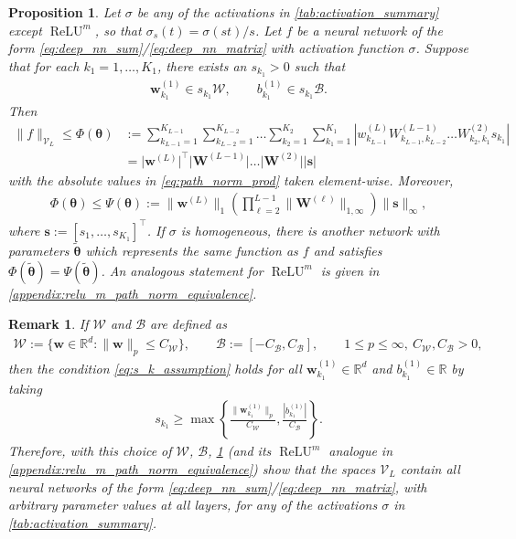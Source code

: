 \documentclass{article}
\DeclareMathOperator{\ReLU}{\mathrm{ReLU}}
\def\vtheta{{\bm{\theta}}}
\def\vs{{\bm{s}}}
\def\vw{{\bm{w}}}
\def\mW{{\bm{W}}}
\def\cB{{\mathcal{B}}}
\def\cV{{\mathcal{V}}}
\def\cW{{\mathcal{W}}}
\newcommand{\R}{\mathbb{R}}
\newtheorem{proposition}[theorem]{Proposition}
\newtheorem{remark}[theorem]{Remark}
\begin{document}
\begin{proposition} \label{prop:path_norm_equivalence}
      Let $\sigma$ be any of the activations in \cref{tab:activation_summary} except $\ReLU^m$, so that $\sigma_s(t) = \sigma(st)/s$. Let $f$ be a neural network of the form \eqref{eq:deep_nn_sum}/\eqref{eq:deep_nn_matrix} with activation function $\sigma$. Suppose that for each $k_1 = 1, \dots, K_1$, there exists an $s_{k_1} > 0$ such that 
    \begin{align} \label{eq:s_k_assumption}
         \vw_{k_1}^{(1)} \in s_{k_1} \cW, \qquad b_{k_1}^{(1)} \in s_{k_1} \cB.
    \end{align}
    Then
    \begin{align} 
        \| f \|_{\cV_L} \leq \Phi(\vtheta) &:= \sum_{k_{L-1}=1}^{K_{L-1}}     \sum_{k_{L-2}=1}^{K_{L-2}} \dots     \sum_{k_{2}=1}^{K_{2}}     \sum_{k_{1}=1}^{K_{1}}     \left| w_{k_{L-1}}^{(L)} W_{k_{L-1},k_{L-2}}^{(L-1)}  \dots  W_{k_2,k_1}^{(2)} s_{k_1} \right| \label{eq:path_norm_sum} \\
        &= \big| \vw^{(L)} \big|^\top \big| \mW^{(L-1)} \big| \dots \big| \mW^{(2)} \big| |\vs| \label{eq:path_norm_prod}
    \end{align}
    with the absolute values in \eqref{eq:path_norm_prod} taken element-wise. Moreover,
    \begin{align} \label{eq:path_norm_upper_bound_psi}
        \Phi(\vtheta) \leq \Psi(\vtheta) := \| \vw^{(L)} \|_1 \left( \prod_{\ell=2}^{L-1} \| \mW^{(\ell)} \|_{1,\infty} \right) \| \vs \|_\infty,
    \end{align}
    where $\vs := [s_1, \dots, s_{K_1}]^\top$. If $\sigma$ is homogeneous, there is another network with parameters $\widetilde{\vtheta}$ which represents the same function as $f$ and satisfies $\Phi(\widetilde{\vtheta}) = \Psi(\widetilde{\vtheta})$. An analogous statement for $\ReLU^m$ is given in \cref{appendix:relu_m_path_norm_equivalence}.
\end{proposition}
\begin{remark} \label{remark:admissible_weight_bias_sufficient_condition}
    If $\cW$ and $\cB$ are defined as
    \begin{align} \label{eq:admissible_weight_bias_sufficient_condition}
        \cW := \{ \vw \in \R^d: \| \vw \|_p \leq C_{\cW} \}, \qquad \cB := [-C_{\cB}, C_{\cB}], \qquad 1 \leq p \leq \infty, \ C_{\cW}, C_{\cB} > 0,
    \end{align}
    then the condition \eqref{eq:s_k_assumption} holds for \textit{all} $\vw_{k_1}^{(1)} \in \R^d$ and $b_{k_1}^{(1)} \in \R$ by taking
    \begin{align}
        s_{k_1} \geq \max \left\{ \frac{\| \vw_{k_1}^{(1)} \|_p}{C_{\cW}}, \frac{|b_{k_1}^{(1)}|}{C_{\cB}} \right\}.
    \end{align}
    Therefore, with this choice of $\cW$, $\cB$, \cref{prop:path_norm_equivalence} (and its $\ReLU^m$ analogue in \cref{appendix:relu_m_path_norm_equivalence}) show that the spaces $\cV_L$ contain \textit{all} neural networks of the form \eqref{eq:deep_nn_sum}/\eqref{eq:deep_nn_matrix}, with arbitrary parameter values at all layers, for any of the activations $\sigma$ in \cref{tab:activation_summary}. 
\end{remark}
\end{document}
